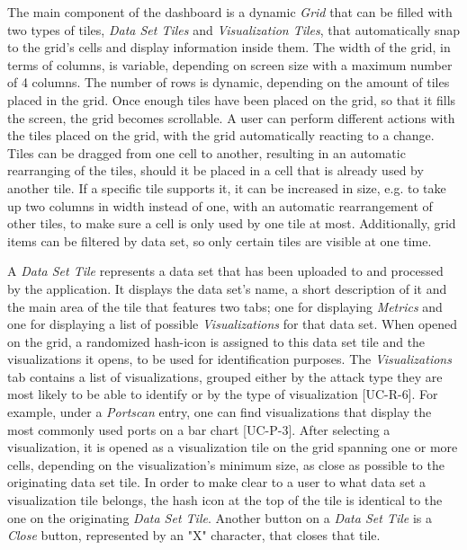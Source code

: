 The main component of the dashboard is a dynamic \emph{Grid} that can be filled with two types of tiles, \emph{Data Set Tiles} and \emph{Visualization Tiles}, that automatically snap to the grid's cells and display information inside them. The width of the grid, in terms of columns, is variable, depending on screen size with a maximum number of 4 columns. The number of rows is dynamic, depending on the amount of tiles placed in the grid. Once enough tiles have been placed on the grid, so that it fills the screen, the grid becomes scrollable.
A user can perform different actions with the tiles placed on the grid, with the grid automatically reacting to a change. Tiles can be dragged from one cell to another, resulting in an automatic rearranging of the tiles, should it be placed in a cell that is already used by another tile. If a specific tile supports it, it can be increased in size, e.g. to take up two columns in width instead of one, with an automatic rearrangement of other tiles, to make sure a cell is only used by one tile at most. Additionally, grid items can be filtered by data set, so only certain tiles are visible at one time.

A \emph{Data Set Tile} represents a data set that has been uploaded to and processed by the application. It displays the data set's name, a short description of it and the main area of the tile that features two tabs; one for displaying \emph{Metrics} and one for displaying a list of possible \emph{Visualizations} for that data set. When opened on the grid, a randomized hash-icon is assigned to this data set tile and the visualizations it opens, to be used for identification purposes. 
The \emph{Visualizations} tab contains a list of visualizations, grouped either by the attack type they are most likely to be able to identify or by the type of visualization [UC-R-6]. For example, under a \emph{Portscan} entry, one can find visualizations that display the most commonly used ports on a bar chart [UC-P-3].
After selecting a visualization, it is opened as a visualization tile on the grid spanning one or more cells, depending on the visualization’s minimum size, as close as possible to the originating data set tile. In order to make clear to a user to what data set a visualization tile belongs, the hash icon at the top of the tile is identical to the one on the originating \emph{Data Set Tile}. Another button on a \emph{Data Set Tile} is a \emph{Close} button, represented by an "X" character, that closes that tile.

